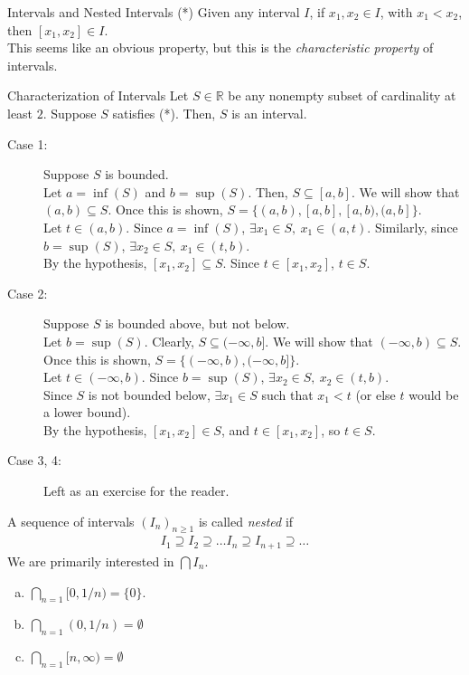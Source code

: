 \documentclass[10pt]{extarticle}
\newcommand{\R}{\mathbb{R}}
\begin{document}
  \begin{problem}{Intervals and Nested Intervals}
    (*) Given any interval $I$, if $x_1,x_2\in I$, with $x_1 < x_2$, then $[x_1,x_2]\in I$.\\

    This seems like an obvious property, but this is the \textit{characteristic property} of intervals.
    \begin{problem}{Characterization of Intervals}
      Let $S\in\R$ be any nonempty subset of cardinality at least $2$. Suppose $S$ satisfies (*). Then, $S$ is an interval.
      \tcblower
      \begin{description}
        \item[Case 1:] Suppose $S$ is bounded.\\

          Let $a = \inf(S)$ and $b = \sup(S)$. Then, $S \subseteq [a,b]$. We will show that $(a,b)\subseteq S$. Once this is shown, $S = \{(a,b), [a,b], [a,b), (a,b]\}$.\\

          Let $t\in (a,b)$. Since $a = \inf(S)$, $\exists x_1\in S,~x_1 \in (a,t)$. Similarly, since $b = \sup(S)$, $\exists x_2\in S,~x_1\in (t,b)$.\\

          By the hypothesis, $[x_1,x_2]\subseteq S$. Since $t\in [x_1,x_2]$, $t\in S$.
        \item[Case 2:] Suppose $S$ is bounded above, but not below.\\

          Let $b = \sup(S)$. Clearly, $S \subseteq (-\infty,b]$. We will show that $(-\infty,b)\subseteq S$. Once this is shown, $S = \{(-\infty,b), (-\infty,b]\}$.\\

          Let $t\in (-\infty,b)$. Since $b = \sup(S)$, $\exists x_2\in S,~x_2\in (t,b)$.\\

          Since $S$ is not bounded below, $\exists x_1\in S$ such that $x_1 < t$ (or else $t$ would be a lower bound).\\

          By the hypothesis, $[x_1,x_2]\in S$, and $t\in [x_1,x_2]$, so $t\in S$.
        \item[Case 3, 4:] Left as an exercise for the reader.
      \end{description}
    \end{problem}
    A sequence of intervals $(I_n)_{n \geq 1}$ is called \textit{nested} if
    \begin{align*}
      I_1 \supseteq I_2 \supseteq \dots I_n \supseteq I_{n+1} \supseteq\dots
    \end{align*}
    We are primarily interested in $\bigcap I_n$.
    \begin{enumerate}[(a)]
      \item $\bigcap_{n=1}[0,1/n) = \{0\}$.
      \item $\bigcap_{n=1}(0,1/n) = \emptyset$
      \item $\bigcap_{n=1}[n,\infty) = \emptyset$
    \end{enumerate}
  \end{problem}
\end{document}
